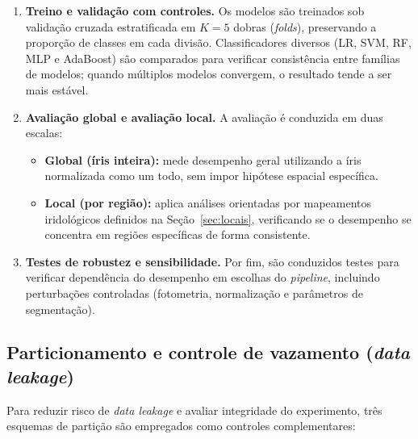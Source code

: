 \documentclass[11pt,a4paper]{article}
\begin{document}
\begin{enumerate}
\begin{itemize}
    \item \textbf{Descritores de textura/contraste:} medidas extraídas da íris normalizada, incluindo: (i) \textbf{estatísticas de intensidade e histogramas} (média, desvio padrão, assimetria e curtose), que descrevem a distribuição global dos níveis de cinza \citep{GonzalezWoods2018}; (ii) \textbf{\textit{Local Binary Patterns} (LBP)}, que codificam a microtextura comparando cada pixel à sua vizinhança, realçando bordas e sulcos \citep{Ojala2002LBP}; e (iii) \textbf{GLCM e descritores de Haralick} (contraste, correlação, energia e homogeneidade), que resumem a organização espacial da textura \citep{Haralick1973Texture}. Esses descritores são avaliados comparativamente para verificar se capturam padrões estruturais estáveis, e não apenas ruído ou artefatos do pré-processamento.
\end{itemize}

    \item \textbf{Treino e validação com controles.}
    Os modelos são treinados sob validação cruzada estratificada em \(K=5\) dobras (\textit{folds}), preservando a proporção de classes em cada divisão. Classificadores diversos (LR, SVM, RF, MLP e AdaBoost) são comparados para verificar consistência entre famílias de modelos; quando múltiplos modelos convergem, o resultado tende a ser mais estável.

    \item \textbf{Avaliação global e avaliação local.}
    A avaliação é conduzida em duas escalas:
    \begin{itemize}
        \item \textbf{Global (íris inteira):} mede desempenho geral utilizando a íris normalizada como um todo, sem impor hipótese espacial específica.
        \item \textbf{Local (por região):} aplica análises orientadas por mapeamentos iridológicos definidos na Seção~\ref{sec:locais}, verificando se o desempenho se concentra em regiões específicas de forma consistente.
    \end{itemize}

    \item \textbf{Testes de robustez e sensibilidade.}
    Por fim, são conduzidos testes para verificar dependência do desempenho em escolhas do \textit{pipeline}, incluindo perturbações controladas (fotometria, normalização e parâmetros de segmentação).
\end{enumerate}

\subsection{Particionamento e controle de vazamento (\textit{data leakage})}
Para reduzir risco de \textit{data leakage} e avaliar integridade do experimento, três esquemas de partição são empregados como controles complementares:
\end{document}
